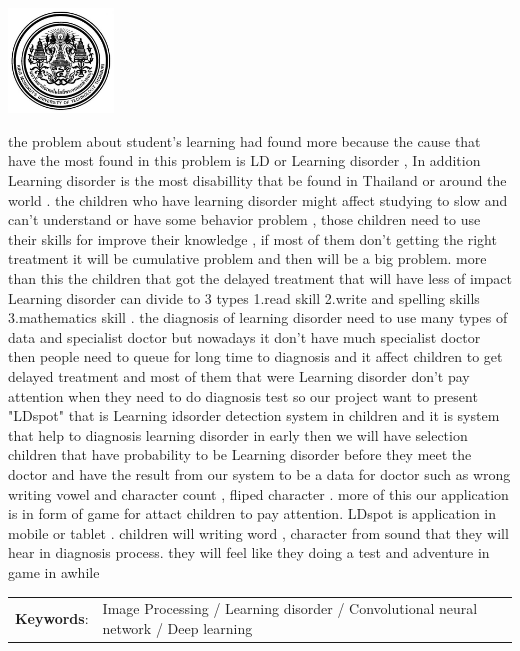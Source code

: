 \documentclass[12pt,oneside,openright,a4paper]{cpe-thai-project}
\begin{document}
\pdfstringdefDisableCommands{%
\let\MakeUppercase\relax
}
\begin{center}
\includegraphics[width=2.8cm]{logo02.jpg}
\end{center}
\vspace*{-1cm}
\maketitlepage
\makesignaturepage 

\abstract

the problem about student's learning had found more because the cause that have the most found
 in this problem is LD or Learning disorder , In addition Learning disorder is the most disabillity that be found in Thailand
or around the world . the children who have learning disorder might affect studying to slow and can't understand or have some
behavior problem , those children need to use their skills for improve their knowledge , if most of them don't getting the right treatment 
it will be cumulative problem and then will be a big problem. more than this the children that got the delayed treatment that will have less of impact 
    Learning disorder can divide to 3 types 1.read skill 2.write and spelling skills 3.mathematics skill . the diagnosis of learning disorder need to use 
many types of data and specialist doctor  but nowadays it don't have much specialist doctor then people need to queue for long time to diagnosis and it affect 
children to get delayed treatment and most of them that were Learning disorder don't pay attention when they need to do diagnosis test 
    so our project want to present "LDspot" that is Learning idsorder detection system in children and it is system that help to diagnosis learning disorder in early 
then we will have selection children that have probability to be Learning disorder before they meet the doctor and have the result from our system to be a data for doctor
such as wrong writing vowel and character count , fliped character . more of this our application is in form of game for attact children to pay attention. LDspot is application in 
mobile or tablet . children will writing word , character from sound that they will hear in diagnosis process. they will feel like they doing a test and adventure in game in awhile
\begin{flushleft}
\begin{tabular*}{\textwidth}{@{}lp{}}
\textbf{Keywords}: & Image Processing / Learning disorder / Convolutional neural network / Deep learning
\end{tabular*}
\end{flushleft}
\endabstract
\end{document}
